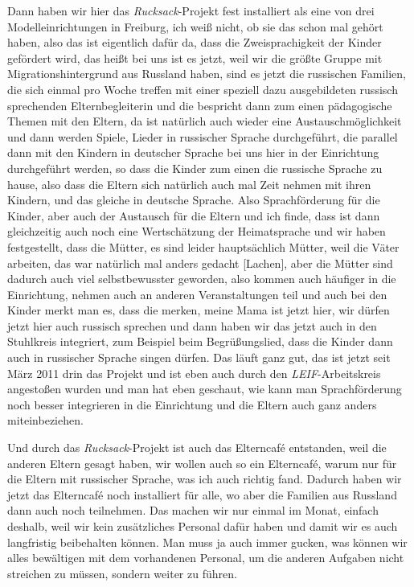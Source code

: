 \begin{linenumbers*}
Dann haben wir hier das \emph{Rucksack}-Projekt fest installiert als eine von drei Modelleinrichtungen in Freiburg, ich weiß nicht, ob sie das schon mal gehört haben, also das ist eigentlich dafür da, dass die Zweisprachigkeit der Kinder gefördert wird, das heißt bei uns ist es jetzt, weil wir die größte Gruppe mit Migrationshintergrund aus Russland haben, sind es jetzt die russischen Familien, die sich einmal pro Woche treffen mit einer speziell dazu ausgebildeten russisch sprechenden Elternbegleiterin und die bespricht dann zum einen pädagogische Themen mit den Eltern, da ist natürlich auch wieder eine Austauschmöglichkeit und dann werden Spiele, Lieder in russischer Sprache durchgeführt, die parallel dann mit den Kindern in deutscher Sprache bei uns hier in der Einrichtung durchgeführt werden, so dass die Kinder zum einen die russische Sprache zu hause, also dass die Eltern sich natürlich auch mal Zeit nehmen mit ihren Kindern, und das gleiche in deutsche Sprache. Also Sprachförderung für die Kinder, aber auch der Austausch für die Eltern und ich finde, dass ist dann gleichzeitig auch noch eine Wertschätzung der Heimatsprache und wir haben festgestellt, dass die Mütter, es sind leider hauptsächlich Mütter, weil die Väter arbeiten, das war natürlich mal anders gedacht {[Lachen]}, aber die Mütter sind dadurch auch viel selbstbewusster geworden, also kommen auch häufiger in die Einrichtung, nehmen auch an anderen Veranstaltungen teil und auch bei den Kinder merkt man es, dass die merken, meine Mama ist jetzt hier, wir dürfen jetzt hier auch russisch sprechen und dann haben wir das jetzt auch in den Stuhlkreis integriert, zum Beispiel beim Begrüßungslied, dass die Kinder dann auch in russischer Sprache singen dürfen. Das läuft ganz gut, das ist jetzt seit März 2011 drin das Projekt und ist eben auch durch den \emph{LEIF}-Arbeitskreis angestoßen wurden und man hat eben geschaut, wie kann man Sprachförderung noch besser integrieren in die Einrichtung und die Eltern auch ganz anders miteinbeziehen. 

Und durch das \emph{Rucksack}-Projekt ist auch das Elterncafé entstanden, weil die anderen Eltern gesagt haben, wir wollen auch so ein Elterncafé, warum nur für die Eltern mit russischer Sprache, was ich auch richtig fand. Dadurch haben wir jetzt das Elterncafé noch installiert für alle, wo aber die Familien aus Russland dann auch noch teilnehmen. Das machen wir nur einmal im Monat, einfach deshalb, weil wir kein zusätzliches Personal dafür haben und damit wir es auch langfristig beibehalten können. Man muss ja auch immer gucken, was können wir alles bewältigen mit dem vorhandenen Personal, um die anderen Aufgaben nicht streichen zu müssen, sondern weiter zu führen.   


\end{linenumbers*}

